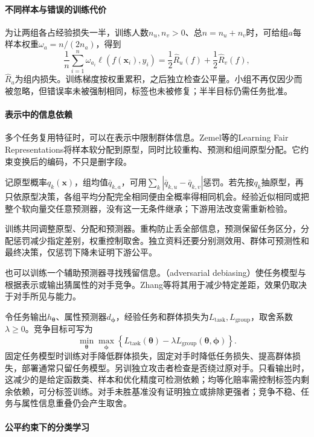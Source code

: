 \paragraph{不同样本与错误的训练代价}

为让两组各占经验损失一半，训练人数$n_u,n_v>0$、总$n=n_u+n_v$时，可给组$a$每样本权重$\omega_a=n/(2n_a)$，得到
\[
 \frac1n\sum_{i=1}^{n}\omega_{a_i}\ell(f(\bm x_i),y_i)
 =\frac12\hat R_u(f)+\frac12\hat R_v(f),
\]
$\hat R_a$为组内损失。训练梯度按权重累积，之后独立检查公平量。小组不再仅因少而被忽略，但错误率未被强制相同，标签也未被修复；半半目标仍需任务批准。

\paragraph{表示中的信息依赖}

多个任务复用特征时，可以在表示中限制群体信息。Zemel等的Learning Fair Representations将样本软分配到原型，同时比较重构、预测和组间原型分配。它约束变换后的编码，不只是删字段。

记原型概率$q_k(\bm{x})$，组均值$\bar q_{k,a}$，可用$\sum_k|\bar q_{k,u}-\bar q_{k,v}|$惩罚。若先按$q_k$抽原型，再只依原型决策，各组平均分配完全相同便由全概率得相同机会。经验近似相同或把整个软向量交任意预测器，没有这一无条件继承；下游用法改变需重新检验。

训练共同调整原型、分配和预测器。重构防止丢全部信息，预测保留任务区分，分配惩罚减少指定差别，权重控制取舍。独立资料还要分别测效用、群体可预测性和最终决策，仅惩罚下降未证明下游公平。

也可以训练一个辅助预测器寻找残留信息。（adversarial debiasing）使任务模型与根据表示或输出猜属性的对手竞争。Zhang等将其用于减少特定差距，效果仍取决于对手所见与能力。

令任务输出$h_{\bm{\theta}}$、属性预测器$d_{\bm{\phi}}$，经验任务和群体损失为$L_{\mathrm{task}},L_{\mathrm{group}}$，取舍系数$\lambda\geq0$。竞争目标可写为
\[
 \min_{\bm{\theta}}\max_{\bm{\phi}}
 \left\{L_{\mathrm{task}}(\bm{\theta})
       -\lambda L_{\mathrm{group}}(\bm{\theta},\bm{\phi})\right\}.
\]
固定任务模型时训练对手降低群体损失，固定对手时降低任务损失、提高群体损失，部署通常只留任务模型。另训独立攻击者检查是否绕过原对手。只看输出时，这减少的是给定函数类、样本和优化精度可检测依赖；均等化赔率需控制标签内剩余依赖，可分标签训练。对手未胜基准没有证明独立或排除更强者；竞争不稳、任务与属性信息重叠仍会产生取舍。

\paragraph{公平约束下的分类学习}

